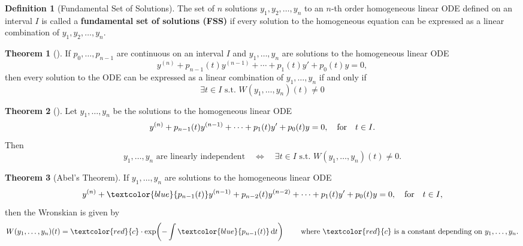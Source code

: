 \documentclass[10pt,UTF8]{article}
\newenvironment{definitionBox}
{
  \begin{tcolorbox}[colback=blue!5!white,colframe=blue!75!black,parbox=false,before
  upper=\par,before lower=\par]}
  {
\end{tcolorbox}}
\newenvironment{theoremBox}
{
  \begin{tcolorbox}[colback=yellow!5!white,colframe=yellow!75!black,parbox=false,before
  upper=\par,before lower=\par]}
  {
\end{tcolorbox}}
\theoremstyle{definition}
\newtheorem{definition inner}{Definition}[section]
\newenvironment{definition}[1][]
{
  \begin{definitionBox}
  \begin{definition inner}[#1]\hfill\par}
    {
    \end{definition inner}
\end{definitionBox}}
\theoremstyle{definition}
\newtheorem{theorem inner}{Theorem}[section]
\newenvironment{theorem}[1][]
{
  \begin{theoremBox}
  \begin{theorem inner}[#1]\hfill\par}
    {
    \end{theorem inner}
\end{theoremBox}}
\theoremstyle{definition}
\newtheorem*{proof inner}{\textit{Proof}}
\theoremstyle{plain}
\newtheorem{tip inner}{Tip}[section]
\theoremstyle{remark}
\begin{document}
\begin{definition}[Fundamental Set of Solutions]
  {}\label{def: Fundamental Set of Solutions}
  The set of \(n\) solutions \(y_1, y_2, \ldots, y_n\) to
  an \(n\)-th order homogeneous linear ODE defined on an interval \(I\)
  is called a \textbf{fundamental set of solutions (FSS)}
  if every solution to the homogeneous equation can be
  expressed as a linear combination of \(y_1, y_2, \ldots, y_n\).
\end{definition}

\begin{theorem}
  If \(p_0,\ldots,p_{n-1}\) are continuous on an interval \(I\) and
  \(y_1, \ldots, y_n\) are solutions to the homogeneous linear ODE
  \begin{equation*}
    y^{(n)} + p_{n-1}(t) y^{(n-1)} + \cdots + p_1(t) y' + p_0(t) y = 0,
  \end{equation*}
  then every solution to the ODE can be expressed as a linear
  combination of \(y_1, \ldots, y_n\) if and only if
  \begin{equation*}
    \exists t\in I \text{ s.t. } W(y_1, \ldots, y_n)(t) \neq 0
  \end{equation*}
\end{theorem}

\begin{theorem}
  Let \(y_1,\ldots,y_n\) be the solutions to the homogeneous linear ODE
  \begin{equation*}
    y^{(n)} + p_{n-1}(t) y^{(n-1)} + \cdots + p_1(t) y' + p_0(t) y = 0,
    \qfor t\in I.
  \end{equation*}
  Then
  \begin{equation*}
    y_1, \ldots, y_n \text{ are linearly independent}
    \quad\iff\quad
    \exists t\in I \text{ s.t. } W(y_1, \ldots, y_n)(t) \neq 0.
  \end{equation*}
\end{theorem}

\begin{theorem}[Abel's Theorem]
  {}\label{thm: Abel's Theorem}
  If \(y_1, \ldots, y_n\) are solutions to the homogeneous linear ODE
  \begin{equation*}
    y^{(n)} + \textcolor{blue}{p_{n-1}(t)} y^{(n-1)}
    + p_{n-2}(t) y^{(n-2)} + \cdots + p_1(t) y' + p_0(t) y = 0,
    \qfor t\in I,
  \end{equation*}
  then the Wronskian is given by
  \begin{equation*}
    W(y_1, \ldots, y_n)(t) = \textcolor{red}{c} \cdot
    \exp(-\int \textcolor{blue}{p_{n-1}(t)} \dd{t})
    \qquad\text{ where } \textcolor{red}{c}
    \text{ is a constant depending on } y_1, \ldots, y_n.
  \end{equation*}
\end{theorem}
\end{document}
